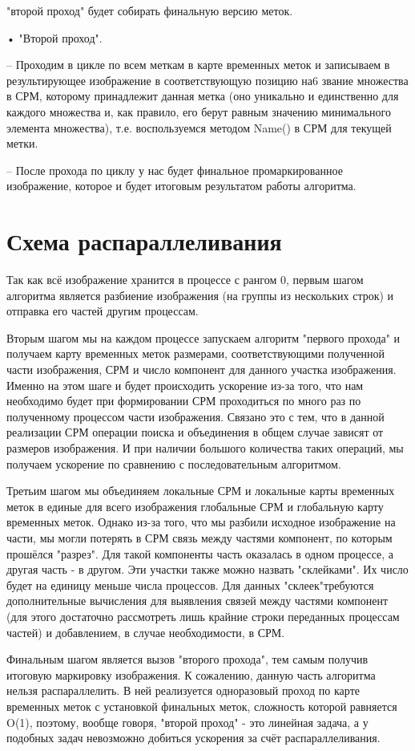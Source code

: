 \documentclass{report}
\begin{document}
"второй проход" будет собирать финальную версию меток.
\par • "Второй проход".
\par – Проходим в цикле по всем меткам в карте временных меток и записываем в результирующее изображение в соответствующую позицию на6
звание множества в СРМ, которому принадлежит данная метка (оно
уникально и единственно для каждого множества и, как правило, его
берут равным значению минимального элемента множества), т.е. воспользуемся методом Name() в СРМ для текущей метки.
\par – После прохода по циклу у нас будет финальное промаркированное изображение, которое и будет итоговым результатом работы алгоритма.

\newpage

\section*{Схема распараллеливания}
\par Так как всё изображение хранится в процессе с рангом 0, первым шагом
алгоритма является разбиение изображения (на группы из нескольких строк)
и отправка его частей другим процессам.
\par Вторым шагом мы на каждом процессе запускаем алгоритм "первого прохода" и получаем карту временных меток размерами, соответствующими полученной части изображения, СРМ и число компонент для данного участка изображения. Именно на этом шаге и будет происходить ускорение из-за того, что
нам необходимо будет при формировании СРМ проходиться по много раз по
полученному процессом части изображения. Связано это с тем, что в данной
реализации СРМ операции поиска и объединения в общем случае зависят от
размеров изображения. И при наличии большого количества таких операций,
мы получаем ускорение по сравнению с последовательным алгоритмом.
\par Третьим шагом мы объединяем локальные СРМ и локальные карты временных меток в единые для всего изображения глобальные СРМ и глобальную
карту временных меток. Однако из-за того, что мы разбили исходное изображение на части, мы могли потерять в СРМ связь между частями компонент,
по которым прошёлся "разрез". Для такой компоненты часть оказалась в одном процессе, а другая часть - в другом. Эти участки также можно назвать
"склейками". Их число будет на единицу меньше числа процессов. Для данных
"склеек"требуются дополнительные вычисления для выявления связей между
частями компонент (для этого достаточно рассмотреть лишь крайние строки
переданных процессам частей) и добавлением, в случае необходимости, в СРМ.
\par Финальным шагом является вызов "второго прохода", тем самым получив
итоговую маркировку изображения. К сожалению, данную часть алгоритма
нельзя распараллелить. В ней реализуется одноразовый проход по карте временных меток с установкой финальных меток, сложность которой равняется
O(1), поэтому, вообще говоря, "второй проход" - это линейная задача, а у подобных задач невозможно добиться ускорения за счёт распараллеливания.
\newpage
\end{document}
